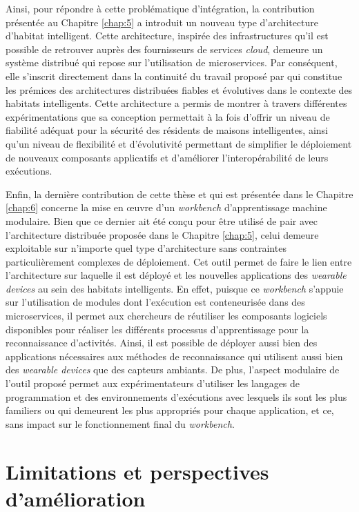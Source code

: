 Ainsi, pour répondre à cette problématique d'intégration, la contribution présentée au Chapitre \ref{chap:5} a introduit un nouveau type d'architecture d'habitat intelligent. Cette architecture, inspirée des infrastructures qu'il est possible de retrouver auprès des fournisseurs de services \textit{cloud}, demeure un système distribué qui repose sur l'utilisation de microservices. Par conséquent,  elle s'inscrit directement dans la continuité du travail proposé par \cite{Plantevin2018} qui constitue les prémices des architectures distribuées fiables et évolutives dans le contexte des habitats intelligents. Cette architecture a permis de montrer à travers différentes expérimentations que sa conception permettait à la fois d'offrir un niveau de fiabilité adéquat pour la sécurité des résidents de maisons intelligentes, ainsi qu'un niveau de flexibilité et d'évolutivité permettant de simplifier le déploiement de nouveaux composants applicatifs et d'améliorer l'interopérabilité de leurs exécutions.

Enfin, la dernière contribution de cette thèse et qui est présentée dans le Chapitre \ref{chap:6} concerne la mise en \oe{}uvre d'un \textit{workbench} d'apprentissage machine modulaire. Bien que ce dernier ait été conçu pour être utilisé de pair avec l'architecture distribuée proposée dans le Chapitre \ref{chap:5}, celui demeure exploitable sur n'importe quel type d'architecture sans contraintes particulièrement complexes de déploiement. Cet outil permet de faire le lien entre l'architecture sur laquelle il est déployé et les nouvelles applications des \textit{wearable devices} au sein des habitats intelligents. En effet, puisque ce \textit{workbench} s'appuie sur l'utilisation de modules dont l'exécution est conteneurisée dans des microservices, il permet aux chercheurs de réutiliser les composants logiciels disponibles pour réaliser les différents processus d'apprentissage pour la reconnaissance d'activités. Ainsi, il est possible de déployer aussi bien des applications nécessaires aux méthodes de reconnaissance qui utilisent aussi bien des \textit{wearable devices} que des capteurs ambiants. De plus, l'aspect modulaire de l'outil proposé permet aux expérimentateurs d'utiliser les langages de programmation et des environnements d'exécutions avec lesquels ils sont les plus familiers ou qui demeurent les plus appropriés pour chaque application, et ce, sans impact sur le fonctionnement final du \textit{workbench}.

\section{Limitations et perspectives d'amélioration}

